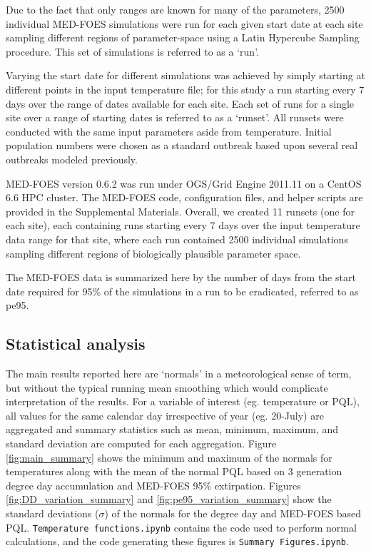 \documentclass[10pt,a4paper,twocolumn]{article}
\begin{document}
Due to the fact that only ranges are known for many of the parameters,
2500 individual MED-FOES simulations were run for each given start date at each site 
sampling different regions of parameter-space using a Latin Hypercube Sampling\cite{10.2307/1403510} procedure.
This set of simulations is referred to as a `run'.

Varying the start date for different simulations was achieved by simply 
starting at different points in the input temperature file; 
for this study a run starting every 7 days over the range of dates available for each site.
Each set of runs for a single site over a range of starting dates is referred to as a `runset'.
All runsets were conducted with the same input parameters aside from temperature.
Initial population numbers were chosen as a standard outbreak based upon several real 
outbreaks modeled previously\cite{manoukis_agent-based_2014}.

MED-FOES version 0.6.2 was run under OGS/Grid Engine 2011.11 on a CentOS 6.6 HPC cluster.
The MED-FOES code, configuration files, and helper scripts are provided in the Supplemental Materials.
Overall, we created 11 runsets (one for each site), 
each containing runs starting every 7 days over the input temperature data range for that site,
where each run contained 2500 individual simulations sampling different regions of 
biologically plausible parameter space.

The MED-FOES data is summarized here by the number of days from the start date required for
95\% of the simulations in a run to be eradicated, referred to as pe95.

\subsection*{Statistical analysis}

The main results reported here are `normals' in a meteorological sense of term,
but without the typical running mean smoothing which would complicate
interpretation of the results.
For a variable of interest (eg. temperature or PQL), 
all values for the same calendar day irrespective of year (eg. 20-July) are
aggregated and summary statistics such as mean, minimum, maximum, and standard deviation 
are computed for each aggregation.
Figure \ref{fig:main_summary} shows the minimum and maximum of the normals for temperatures
along with the mean of the normal PQL based on 3 generation degree day accumulation 
and MED-FOES 95\% extirpation.
Figures \ref{fig:DD_variation_summary} and \ref{fig:pe95_variation_summary} show the 
standard deviations ($\sigma$) of the normals for the degree day and MED-FOES based PQL.
\texttt{Temperature functions.ipynb} contains the code used to perform normal calculations, 
and the code generating these figures is \texttt{Summary Figures.ipynb}.
\end{document}
